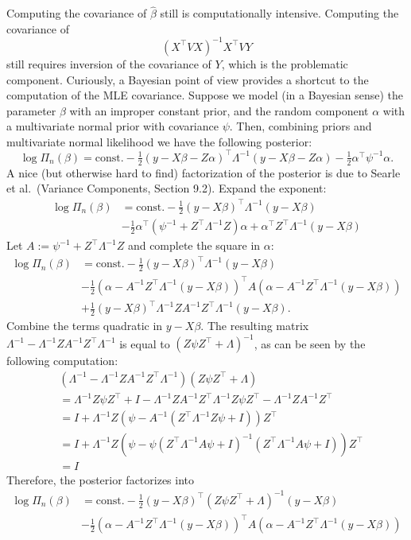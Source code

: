 \documentclass[
]{book}
\begin{document}
Computing the covariance of \(\hat\beta\) still is computationally intensive. Computing the covariance of
\[(X^\top VX)^{-1}X^\top V Y\]
still requires inversion of the covariance of \(Y\), which is the problematic component. Curiously, a Bayesian point of view provides a shortcut to the computation of the MLE covariance. Suppose we model (in a Bayesian sense) the parameter \(\beta\) with an improper constant prior, and the random component \(\alpha\) with a multivariate normal prior with covariance \(\psi\). Then, combining priors and multivariate normal likelihood we have the following posterior:
\[\log\Pi_n(\beta) = \text{const.} - \tfrac12 \left(y - X\beta - Z\alpha\right)^\top \Lambda^{-1}\left(y - X\beta - Z\alpha\right) - \tfrac12\alpha^\top \psi^{-1}\alpha . \]
A nice (but otherwise hard to find) factorization of the posterior is due to Searle et al.~(Variance Components, Section 9.2). Expand the exponent:
\begin{align*}
\log\Pi_n(\beta) &= \text{const.} - \tfrac12 \left(y - X\beta\right)^\top \Lambda^{-1}\left(y - X\beta\right)\\
&-\tfrac12 \alpha^\top (\psi^{-1} + Z^\top \Lambda^{-1}Z)\alpha + \alpha^\top Z^\top \Lambda^{-1}(y - X\beta)
\end{align*}
Let \(A:=\psi^{-1} + Z^\top \Lambda^{-1}Z\) and complete the square in \(\alpha\):
\begin{align*}
\log\Pi_n(\beta) &= \text{const.} - \tfrac12 \left(y - X\beta\right)^\top \Lambda^{-1}\left(y - X\beta\right)\\
&-\tfrac12(\alpha - A^{-1}Z^\top\Lambda^{-1}(y-X\beta))^\top A(\alpha - A^{-1}Z^\top\Lambda^{-1}(y-X\beta))\\
&+\tfrac12(y-X\beta)^\top\Lambda^{-1}ZA^{-1}Z^\top \Lambda^{-1} (y-X\beta). 
\end{align*}
Combine the terms quadratic in \(y-X\beta\). The resulting matrix \(\Lambda^{-1} - \Lambda^{-1}ZA^{-1}Z^\top \Lambda^{-1}\) is equal to \((Z\psi Z^\top + \Lambda)^{-1}\), as can be seen by the following computation:
\begin{align*}
&(\Lambda^{-1} - \Lambda^{-1}ZA^{-1}Z^\top \Lambda^{-1})(Z\psi Z^\top + \Lambda) \\
& = \Lambda^{-1}Z\psi Z^\top + I - \Lambda^{-1}ZA^{-1}Z^\top \Lambda^{-1}Z\psi Z^\top - \Lambda^{-1}ZA^{-1}Z^\top \\
& = I + \Lambda^{-1}Z(\psi - A^{-1}(Z^\top \Lambda^{-1}Z\psi + I))Z^\top \\
& = I+\Lambda^{-1}Z(\psi - \psi(Z^\top \Lambda^{-1}A\psi + I)^{-1}(Z^\top \Lambda^{-1}A\psi + I))Z^\top \\
& = I
\end{align*}
Therefore, the posterior factorizes into
\begin{align*}
\log\Pi_n(\beta) &= \text{const.} - \tfrac12 \left(y - X\beta\right)^\top (Z\psi Z^\top +\Lambda)^{-1}(y - X\beta) \\
&- \tfrac12(\alpha - A^{-1}Z^\top\Lambda^{-1}(y-X\beta))^\top A(\alpha - A^{-1}Z^\top\Lambda^{-1}(y-X\beta)) \end{align*}
\end{document}
